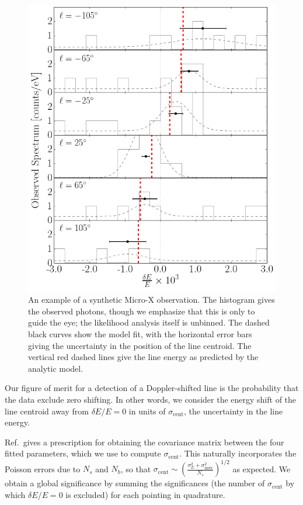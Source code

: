 \documentclass[aps,prd,10pt,twocolumn,superscriptaddress,showpacs,footinbib]{revtex4-1}
\begin{document}
\begin{figure}[h!]
\centering
\includegraphics[width=1.0\columnwidth]{example_obs.png}
\caption{ An example of a synthetic Micro-X observation. The histogram gives the observed photons,
	though we emphasize that this is only to guide the eye; the likelihood analysis itself is
	unbinned. The dashed black curves show the model fit, with the horizontal error bars giving the
	uncertainty in the position of the line centroid. The vertical red dashed lines give the line
	energy as predicted by the analytic model.
}
\label{fig:synobs}
\end{figure}



Our figure of merit for a detection of a Doppler-shifted line is the probability that the data
exclude zero shifting. In other words, we consider the energy shift of the line centroid
away from $\delta E/E=0$ in units of $\sigma_\mathrm{cent}$, the uncertainty in the line energy.

Ref.\,\cite{barlow1990} gives a prescription for obtaining the covariance matrix between the four fitted
parameters, which we use to compute $\sigma_\mathrm{cent}$. This naturally incorporates the Poisson errors due to
$N_s$ and $N_b$, so that $\sigma_\mathrm{cent} \sim \left(\frac{\sigma_E^2+\sigma_\mathrm{instr}^2
}{N_s}\right)^{1/2}$ as expected. 
We obtain a global significance by summing the significances (the
number of $\sigma_\mathrm{cent}$ by which $\delta E/E=0$ is excluded) for each
pointing in quadrature.
\end{document}
